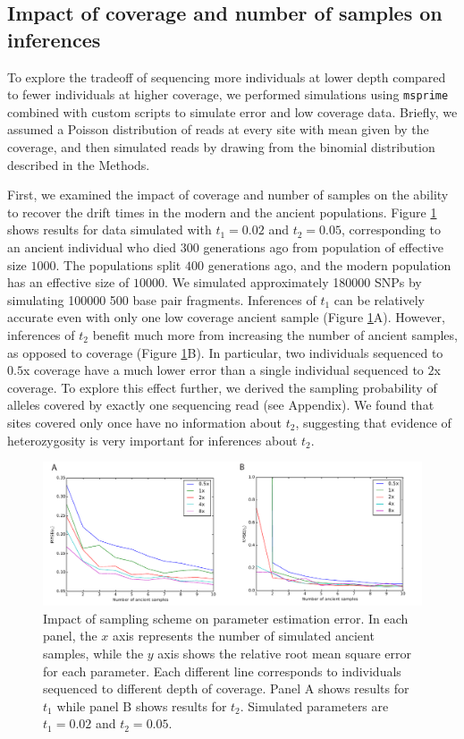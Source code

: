 \documentclass[11pt, oneside]{article}   	%
\begin{document}
\subsection{Impact of coverage and number of samples on inferences}

To explore the tradeoff of sequencing more individuals at lower depth compared to fewer individuals at higher coverage, we performed simulations using \texttt{msprime} \citep{kelleher2016efficient} combined with custom scripts to simulate error and low coverage data. Briefly, we assumed a Poisson distribution of reads at every site with mean given by the coverage, and then simulated reads by drawing from the binomial distribution described in the Methods.

 First, we examined the impact of coverage and number of samples on the ability to recover the drift times in the modern and the ancient populations. Figure \ref{RMSE} shows results for data simulated with $t_1 = 0.02$ and $t_2 = 0.05$, corresponding to an ancient individual who died $300$ generations ago from population of effective size $1000$. The populations split $400$ generations ago, and the modern population has an effective size of $10000$. We simulated approximately 180000 SNPs by simulating 100000 500 base pair fragments. Inferences of $t_1$ can be relatively accurate even with only one low coverage ancient sample (Figure \ref{RMSE}A). However, inferences of $t_2$ benefit much more from increasing the number of ancient samples, as opposed to coverage (Figure \ref{RMSE}B). In particular, two individuals sequenced to $0.5$x coverage have a much lower error than a single individual sequenced to $2$x coverage. To explore this effect further, we derived the sampling probability of alleles covered by exactly one sequencing read (see Appendix). We found that sites covered only once have no information about $t_2$, suggesting that evidence of  heterozygosity is very important for inferences about $t_2$. 

\begin{figure}[h] %
   \centering
   \includegraphics[width=\textwidth]{RMSE_Figure.pdf} 
   \caption{Impact of sampling scheme on parameter estimation error. In each panel, the $x$ axis represents the number of simulated ancient samples, while the $y$ axis shows the relative root mean square error for each parameter. Each different line corresponds to individuals sequenced to different depth of coverage. Panel A shows results for $t_1$ while panel B shows results for $t_2$. Simulated parameters are $t_1 = 0.02$ and $t_2 = 0.05$.}
   \label{RMSE}
\end{figure}
\end{document}

